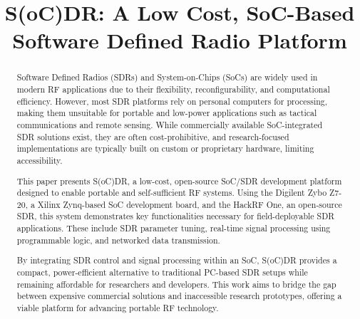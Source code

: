 \documentclass[conference]{IEEEtran}
\begin{document}
\title{S(oC)DR: A Low Cost, SoC-Based Software Defined Radio Platform\\
}

\author{
}

\maketitle

\begin{abstract}
Software Defined Radios (SDRs) and System-on-Chips (SoCs) are widely used in modern RF applications due to their flexibility, reconfigurability, and computational efficiency. However, most SDR platforms rely on personal computers for processing, making them unsuitable for portable and low-power applications such as tactical communications and remote sensing. While commercially available SoC-integrated SDR solutions exist, they are often cost-prohibitive, and research-focused implementations are typically built on custom or proprietary hardware, limiting accessibility.

This paper presents S(oC)DR, a low-cost, open-source SoC/SDR development platform designed to enable portable and self-sufficient RF systems. Using the Digilent Zybo Z7-20, a Xilinx Zynq-based SoC development board, and the HackRF One, an open-source SDR, this system demonstrates key functionalities necessary for field-deployable SDR applications. These include SDR parameter tuning, real-time signal processing using programmable logic, and networked data transmission.
  
By integrating SDR control and signal processing within an SoC, S(oC)DR provides a compact, power-efficient alternative to traditional PC-based SDR setups while remaining affordable for researchers and developers. This work aims to bridge the gap between expensive commercial solutions and inaccessible research prototypes, offering a viable platform for advancing portable RF technology.
\end{abstract}
\end{document}
